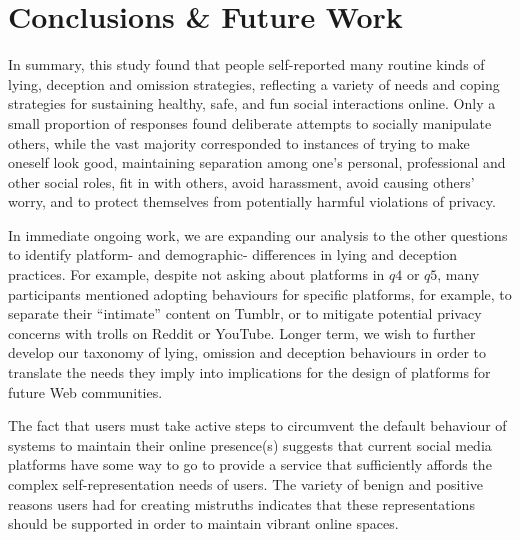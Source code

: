 \documentclass{sig-alternate}
\newcommand{\todo}[1]{\textbf{\color{red}TODO: #1}}
\begin{document}

\section{Conclusions \& Future Work}

In summary, this study found that people self-reported many routine kinds of lying, deception and omission strategies, reflecting a variety of needs and coping strategies for sustaining healthy, safe, and fun social interactions online.  Only a small proportion of responses found deliberate attempts to socially manipulate others, while the vast majority corresponded to instances of trying to make oneself look good, maintaining separation among one's personal, professional and other social roles, fit in with others, avoid harassment, avoid causing others' worry, and to protect themselves from potentially harmful violations of privacy. 

In immediate ongoing work, we are expanding our analysis to the other questions to identify platform- and demographic- differences in lying and deception practices.  For example, despite not asking about platforms in $q4$ or $q5$, many participants mentioned adopting behaviours for specific platforms, for example, to separate their ``intimate'' content on Tumblr, or to mitigate potential privacy concerns with trolls on Reddit or YouTube. Longer term, we wish to further develop our taxonomy of lying, omission and deception behaviours in order to translate the needs they imply into implications for the design of  platforms for future Web communities.

The fact that users must take active steps to circumvent the default behaviour of systems to maintain their online presence(s) suggests that current social media platforms have some way to go to provide a service that sufficiently affords the complex self-representation needs of users. The variety of benign and positive reasons users had for creating mistruths indicates that these representations should be supported in order to maintain vibrant online spaces.
\end{document}
